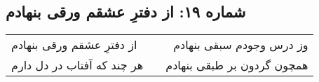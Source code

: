 \begin{center}
\section*{شماره ۱۹: از دفترِ عشقم ورقی بنهادم}
\label{sec:019}
\begin{longtable}{l p{0.5cm} r}
از دفترِ عشقم ورقی بنهادم
&&
وز درس وجودم سبقی بنهادم
\\
هر چند که آفتاب در دل دارم
&&
همچون گردون بر طبقی بنهادم
\\
\end{longtable}
\end{center}
